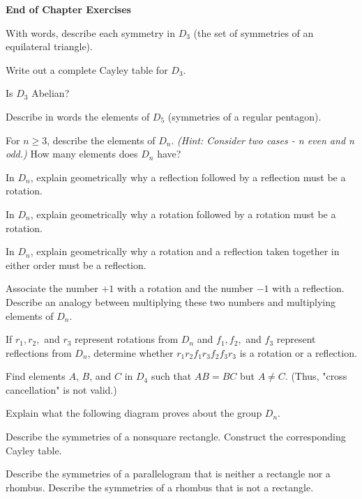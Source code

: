 \documentclass[11pt,largemargins]{homework}
\begin{document}
\maketitle


\textbf{\large{End of Chapter Exercises}}

\question
With words, describe each symmetry in $D_3$ (the set of symmetries of an equilateral triangle).


\question 
Write out a complete Cayley table for $D_3$. 


\question 
Is $D_3$ Abelian?


\question 
Describe in words the elements of $D_5$ (symmetries of a regular pentagon).


\question 
For $n\geq 3$, describe the elements of $D_n$. \textit{(Hint: Consider two cases - n even and n odd.)} 
How many elements does $D_n$ have?


\question 
In $D_n$, explain geometrically why a reflection followed by a reflection must be a rotation.


\question 
In $D_n$, explain geometrically why a rotation followed by a rotation must be a rotation.


\question 
In $D_n$, explain geometrically why a rotation and a reflection taken together in either order must be a reflection.


\question 
Associate the number $+1$ with a rotation and the number $-1$ with a reflection. Describe an analogy between 
multiplying these two numbers and multiplying elements of $D_n$.


\question 
If $r_1,r_2,$ and $r_3$ represent rotations from $D_n$ and $f_1,f_2,$ and $f_3$ represent reflections from $D_n$, 
determine whether $r_1r_2f_1r_3f_2f_3r_3$ is a rotation or a reflection.



\question 
Find elements $A$, $B$, and $C$ in $D_4$ such that $AB=BC$ but $A\neq C$. (Thus, "cross cancellation" is not valid.)


\question 
Explain what the following diagram proves about the group $D_n$.


\question 
Describe the symmetries of a nonsquare rectangle. Construct the corresponding Cayley table.


\question 
Describe the symmetries of a parallelogram that is neither a rectangle nor a rhombus. Describe the symmetries of 
a rhombus that is not a rectangle.
\end{document}

